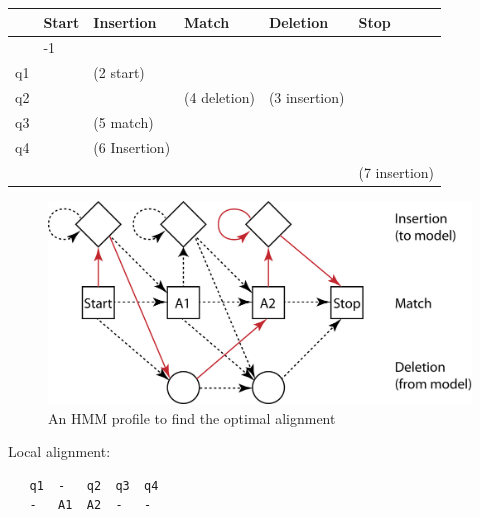 \begin{table}[H]
\small
\centering
\begin{tabular}{|l|l|l|l|l|l|}
\hline
   & Start                    & Insertion                & Match                    & Deletion                 & Stop                     \\ \hline
   & -1                       & \cellcolor[HTML]{C0C0C0} & \cellcolor[HTML]{C0C0C0} & \cellcolor[HTML]{C0C0C0} & \cellcolor[HTML]{C0C0C0} \\ \hline
q1 & \cellcolor[HTML]{C0C0C0} & (2 start)                &                          &                          & \cellcolor[HTML]{C0C0C0} \\ \hline
q2 & \cellcolor[HTML]{C0C0C0} &                          & (4 deletion)             & (3 insertion)            & \cellcolor[HTML]{C0C0C0} \\ \hline
q3 & \cellcolor[HTML]{C0C0C0} & (5 match)                &                          &                          & \cellcolor[HTML]{C0C0C0} \\ \hline
q4 & \cellcolor[HTML]{C0C0C0} & (6 Insertion)            &                          &                          & \cellcolor[HTML]{C0C0C0} \\ \hline
   & \cellcolor[HTML]{C0C0C0} & \cellcolor[HTML]{C0C0C0} & \cellcolor[HTML]{C0C0C0} & \cellcolor[HTML]{C0C0C0} & (7 insertion)            \\ \hline
\end{tabular}
\end{table}

\begin{figure}[H]
  \centering
      \includegraphics[width=0.5 \textwidth]{fig13/HMM_profile_example_2.png}
  \caption{An HMM profile to find the optimal alignment}
\end{figure}

\noindent
Local alignment:
\begin{verbatim}
   q1  -   q2  q3  q4
   -   A1  A2  -   -
\end{verbatim}

\bigskip 

%
